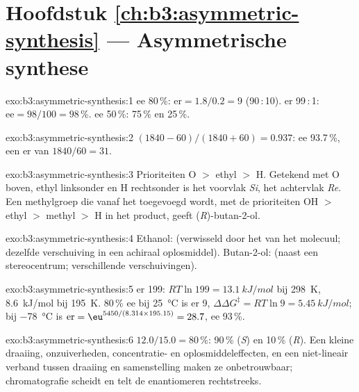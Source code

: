 \section*{Hoofdstuk \ref{ch:b3:asymmetric-synthesis} --- Asymmetrische synthese}

\begin{solution}{exo:b3:asymmetric-synthesis:1}
ee 80\,\%: $\mathrm{er} = 1.8/0.2 = 9$ (90\,:\,10). er 99\,:\,1: $\mathrm{ee} = 98/100 = 98$\,\%. ee 50\,\%: 75\,\% en 25\,\%.
\end{solution}

\begin{solution}{exo:b3:asymmetric-synthesis:2}
$(1840 - 60)/(1840 + 60) = 0.937$: ee 93.7\,\%, een er van $1840/60 = 31$.
\end{solution}

\begin{solution}{exo:b3:asymmetric-synthesis:3}
Prioriteiten O $>$ ethyl $>$ H. Getekend met O boven, ethyl linksonder en H
rechtsonder is het voorvlak \textit{Si}, het achtervlak \textit{Re}. Een methylgroep die vanaf het 
toegevoegd wordt, met de prioriteiten OH $>$ ethyl $>$ methyl $>$ H in het product, geeft (\textit{R})-butan-2-ol.
\end{solution}

\begin{solution}{exo:b3:asymmetric-synthesis:4}
Ethanol:  (verwisseld door het  van het molecuul;
dezelfde verschuiving in een achiraal oplosmiddel). Butan-2-ol:
 (naast een stereocentrum; verschillende verschuivingen).
\end{solution}

\begin{solution}{exo:b3:asymmetric-synthesis:5}
er 199: $RT\ln 199 = \qty{13.1}{kJ/mol}$ bij \qty{298}{K}, \qty{8.6}{kJ/mol} bij \qty{195}{K}. 80\,\% ee bij \qty{25}{\celsius} is er 9,
$\Delta\Delta G^\ddagger = RT\ln 9 = \qty{5.45}{kJ/mol}$; bij \qty{-78}{\celsius} is $\mathrm{er} = \eu^{5450/(8.314 \times 195.15)} = 28.7$, ee 93\,\%.
\end{solution}

\begin{solution}{exo:b3:asymmetric-synthesis:6}
 $12.0/15.0 = 80$\,\%: 90\,\% (\textit{S}) en 10\,\% (\textit{R}). Een kleine draaiing,
onzuiverheden, concentratie- en oplosmiddeleffecten, en een
niet-lineair verband tussen draaiing en samenstelling maken ze
onbetrouwbaar; chromatografie scheidt en telt de enantiomeren
rechtstreeks.
\end{solution}

